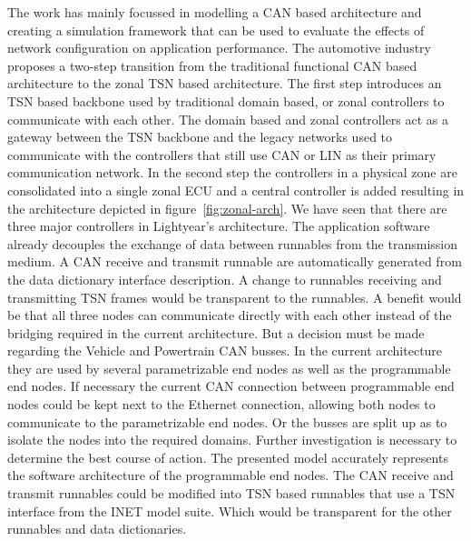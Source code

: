 The work has mainly focussed in modelling a CAN based architecture and creating a simulation framework that can be used to evaluate the effects of network configuration on application performance. The automotive industry proposes a two-step transition from the traditional functional CAN based architecture to the zonal TSN based architecture. The first step introduces an TSN based backbone used by traditional domain based, or zonal controllers to communicate with each other. The domain based and zonal controllers act as a gateway between the TSN backbone and the legacy networks used to communicate with the controllers that still use CAN or LIN as their primary communication network. In the second step the controllers in a physical zone are consolidated into a single zonal ECU and a central controller is added resulting in the architecture depicted in figure~\ref{fig:zonal-arch}. We have seen that there are three major controllers in Lightyear's architecture. The application software already decouples the exchange of data between runnables from the transmission medium. A CAN receive and transmit runnable are automatically generated from the data dictionary interface description. A change to runnables receiving and transmitting TSN frames would be transparent to the runnables. A benefit would be that all three nodes can communicate directly with each other instead of the bridging required in the current architecture. But a decision must be made regarding the Vehicle and Powertrain CAN busses. In the current architecture they are used by several parametrizable end nodes as well as the programmable end nodes. If necessary the current CAN connection between programmable end nodes could be kept next to the Ethernet connection, allowing both nodes to communicate to the parametrizable end nodes. Or the busses are split up as to isolate the nodes into the required domains. Further investigation is necessary to determine the best course of action. The presented model accurately represents the software architecture of the programmable end nodes. The CAN receive and transmit runnables could be modified into TSN based runnables that use a TSN interface from the INET model suite. Which would be transparent for the other runnables and data dictionaries.

